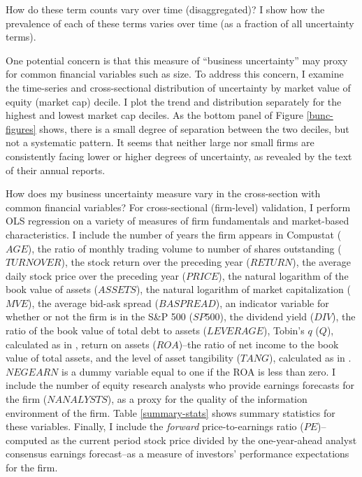 \documentclass[12pt, letterpaper]{article}
\begin{document}
How do these term counts vary over time (disaggregated)? I show how the prevalence of each of these terms varies over time (as a fraction of all uncertainty terms).


One potential concern is that this measure of ``business uncertainty'' may proxy for common financial variables such as size. To address this concern, I examine the time-series and cross-sectional distribution of uncertainty by market value of equity (market cap) decile. I plot the trend and distribution  separately for the highest and lowest market cap deciles. As the bottom panel of Figure \ref{bunc-figures} shows, there is a small degree of separation between the two deciles, but not a systematic pattern. It seems that neither large nor small firms are consistently facing lower or higher degrees of uncertainty, as revealed by the text of their annual reports.

How does my business uncertainty measure vary in the cross-section with common financial variables? For cross-sectional (firm-level) validation, I perform OLS regression on a variety of measures of firm fundamentals and market-based characteristics. I include the number of years the firm appears in Compustat ($AGE$), the ratio of monthly trading volume to number of shares outstanding ($TURNOVER$), the stock return over the preceding year ($RETURN$), the average daily stock price over the preceding year ($PRICE$), the natural logarithm of the book value of assets ($ASSETS$), the natural logarithm of market capitalization ($MVE$), the average bid-ask spread ($BASPREAD$), an indicator variable for whether or not the firm is in the S\&P 500 ($SP500$), the dividend yield ($DIV$), the ratio of the book value of total debt to assets ($LEVERAGE$), Tobin's $q$ ($Q$), calculated as in \cite{chungpruitt1994}, return on assets ($ROA$)--the ratio of net income to the book value of total assets, and the level of asset tangibility ($TANG$), calculated as in \cite{almeidacampello2007}. $NEGEARN$ is a dummy variable equal to one if the ROA is less than zero. I include the number of equity research analysts who provide earnings forecasts for the firm ($NANALYSTS$), as a proxy for the quality of the information environment of the firm. Table \ref{summary-stats} shows summary statistics for these variables. Finally, I include the \emph{forward} price-to-earnings ratio ($PE$)--computed as the current period stock price divided by the one-year-ahead analyst consensus earnings forecast--as a measure of investors' performance expectations for the firm.
\end{document}

